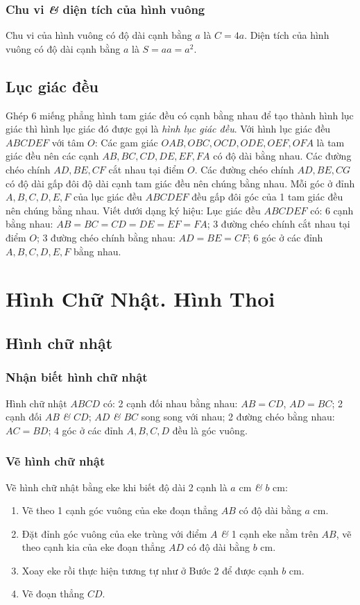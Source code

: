 \documentclass[oneside]{book}
\numberwithin{equation}{section}
\begin{document}
\subsubsection{Chu vi \textit{\&} diện tích của hình vuông}
Chu vi của hình vuông có độ dài cạnh bằng $a$ là $C = 4a$. Diện tích của hình vuông có độ dài cạnh bằng $a$ là $S = aa = a^2$.

\subsection{Lục giác đều}
Ghép 6 miếng phẳng hình tam giác đều có cạnh bằng nhau để tạo thành hình lục giác thì hình lục giác đó được gọi là \emph{hình lục giác đều}. Với hình lục giác đều $ABCDEF$ với tâm $O$: Các gam giác $OAB,OBC,OCD,ODE,OEF,OFA$ là tam giác đều nên các cạnh $AB,BC,CD,DE,EF,FA$ có độ dài bằng nhau. Các đường chéo chính $AD,BE,CF$ cắt nhau tại điểm $O$. Các đường chéo chính $AD,BE,CG$ có độ dài gấp đôi độ dài cạnh tam giác đều nên chúng bằng nhau. Mỗi góc ở đỉnh $A,B,C,D,E,F$ của lục giác đều $ABCDEF$ đều gấp đôi góc của 1 tam giác đều nên chúng bằng nhau. Viết dưới dạng ký hiệu: Lục giác đều $ABCDEF$ có: 6 cạnh bằng nhau: $AB = BC = CD = DE = EF = FA$; 3 đường chéo chính cắt nhau tại điểm $O$; 3 đường chéo chính bằng nhau: $AD = BE = CF$; 6 góc ở các đỉnh $A,B,C,D,E,F$ bằng nhau.


\section{Hình Chữ Nhật. Hình Thoi}

\subsection{Hình chữ nhật}

\subsubsection{Nhận biết hình chữ nhật}
Hình chữ nhật $ABCD$ có: 2 cạnh đối nhau bằng nhau: $AB = CD$, $AD = BC$; 2 cạnh đối $AB$ \textit{\&} $CD$; $AD$ \textit{\&} $BC$ song song với nhau; 2 đường chéo bằng nhau: $AC = BD$; 4 góc ở các đỉnh $A,B,C,D$ đều là góc vuông.

\subsubsection{Vẽ hình chữ nhật}
Vẽ hình chữ nhật bằng eke khi biết độ dài 2 cạnh là $a$ cm \textit{\&} $b$ cm:
\begin{enumerate}
	\item Vẽ theo 1 cạnh góc vuông của eke đoạn thẳng $AB$ có độ dài bằng $a$ cm.
	\item Đặt đỉnh góc vuông của eke trùng với điểm $A$ \textit{\&} 1 cạnh eke nằm trên $AB$, vẽ theo cạnh kia của eke đoạn thẳng $AD$ có độ dài bằng $b$ cm.
	\item Xoay eke rồi thực hiện tương tự như ở Bước 2 để được cạnh $b$ cm.
	\item Vẽ đoạn thẳng $CD$.
\end{enumerate}
\end{document}
